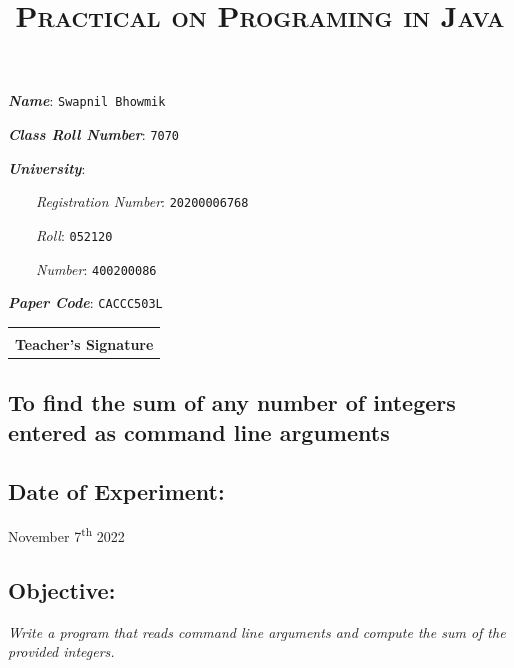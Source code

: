 \documentclass[12pt, a4paper]{article}
\title{\Huge{\textsc{Practical on Programing in Java}}}
\author{}
\date{}
\begin{document}
\parindent0pt

  \begin{titlingpage}
    \maketitle
    \thispagestyle{empty}
    \begin{tcolorbox}
      \textbf{\emph{Name}}: \verb+Swapnil Bhowmik+

      \textbf{\emph{Class Roll Number}}: \verb+7070+

      \textbf{\emph{University}}:

      \ \ \ \ \emph{Registration Number}: \verb+20200006768+

      \ \ \ \ \emph{Roll}: \verb+052120+

      \ \ \ \ \emph{Number}: \verb+400200086+

      \textbf{\emph{Paper Code}}: \verb+CACCC503L+
    \end{tcolorbox}
  \end{titlingpage}
  \newpage

  \thispagestyle{empty}
  \tableofcontents
  \thispagestyle{empty}
  \vspace{2cm}
  \begin{tabular}{@{}p{2.4in}@{}}
  \hrulefill \\
    \textbf{Teacher's Signature}\\
  \end{tabular}
  \newpage

\begin{tcolorbox}
\section{To find the sum of any number of integers entered as command line arguments}
\end{tcolorbox}
\subsection*{Date of Experiment:}
November 7\textsuperscript{th} 2022

\subsection*{Objective:}
\emph{\large{Write a program that reads command line arguments and compute the sum of the provided integers.}}
\end{document}
